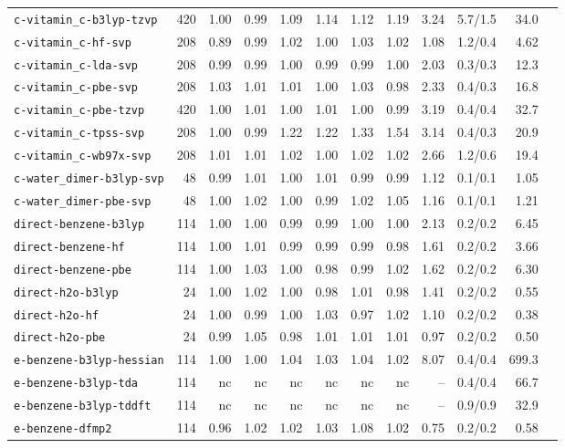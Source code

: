 \begin{longtable}{lrrrrrrrrrrr}
\texttt{c-vitamin\_c-b3lyp-tzvp} & 420 & 1.00 & 0.99 & 1.09 & 1.14 & 1.12 & 1.19 & 3.24 & 5.7/1.5 & 34.0 \\
\texttt{c-vitamin\_c-hf-svp} & 208 & 0.89 & 0.99 & 1.02 & 1.00 & 1.03 & 1.02 & 1.08 & 1.2/0.4 & 4.62 \\
\texttt{c-vitamin\_c-lda-svp} & 208 & 0.99 & 0.99 & 1.00 & 0.99 & 0.99 & 1.00 & 2.03 & 0.3/0.3 & 12.3 \\
\texttt{c-vitamin\_c-pbe-svp} & 208 & 1.03 & 1.01 & 1.01 & 1.00 & 1.03 & 0.98 & 2.33 & 0.4/0.3 & 16.8 \\
\texttt{c-vitamin\_c-pbe-tzvp} & 420 & 1.00 & 1.01 & 1.00 & 1.01 & 1.00 & 0.99 & 3.19 & 0.4/0.4 & 32.7 \\
\texttt{c-vitamin\_c-tpss-svp} & 208 & 1.00 & 0.99 & 1.22 & 1.22 & 1.33 & 1.54 & 3.14 & 0.4/0.3 & 20.9 \\
\texttt{c-vitamin\_c-wb97x-svp} & 208 & 1.01 & 1.01 & 1.02 & 1.00 & 1.02 & 1.02 & 2.66 & 1.2/0.6 & 19.4 \\
\texttt{c-water\_dimer-b3lyp-svp} & 48 & 0.99 & 1.01 & 1.00 & 1.01 & 0.99 & 0.99 & 1.12 & 0.1/0.1 & 1.05 \\
\texttt{c-water\_dimer-pbe-svp} & 48 & 1.00 & 1.02 & 1.00 & 0.99 & 1.02 & 1.05 & 1.16 & 0.1/0.1 & 1.21 \\
\texttt{direct-benzene-b3lyp} & 114 & 1.00 & 1.00 & 0.99 & 0.99 & 1.00 & 1.00 & 2.13 & 0.2/0.2 & 6.45 \\
\texttt{direct-benzene-hf} & 114 & 1.00 & 1.01 & 0.99 & 0.99 & 0.99 & 0.98 & 1.61 & 0.2/0.2 & 3.66 \\
\texttt{direct-benzene-pbe} & 114 & 1.00 & 1.03 & 1.00 & 0.98 & 0.99 & 1.02 & 1.62 & 0.2/0.2 & 6.30 \\
\texttt{direct-h2o-b3lyp} & 24 & 1.00 & 1.02 & 1.00 & 0.98 & 1.01 & 0.98 & 1.41 & 0.2/0.2 & 0.55 \\
\texttt{direct-h2o-hf} & 24 & 1.00 & 0.99 & 1.00 & 1.03 & 0.97 & 1.02 & 1.10 & 0.2/0.2 & 0.38 \\
\texttt{direct-h2o-pbe} & 24 & 0.99 & 1.05 & 0.98 & 1.01 & 1.01 & 1.01 & 0.97 & 0.2/0.2 & 0.50 \\
\texttt{e-benzene-b3lyp-hessian} & 114 & 1.00 & 1.00 & 1.04 & 1.03 & 1.04 & 1.02 & 8.07 & 0.4/0.4 & 699.3 \\
\texttt{e-benzene-b3lyp-tda} & 114 & nc & nc & nc & nc & nc & nc & -- & 0.4/0.4 & 66.7 \\
\texttt{e-benzene-b3lyp-tddft} & 114 & nc & nc & nc & nc & nc & nc & -- & 0.9/0.9 & 32.9 \\
\texttt{e-benzene-dfmp2} & 114 & 0.96 & 1.02 & 1.02 & 1.03 & 1.08 & 1.02 & 0.75 & 0.2/0.2 & 0.58 \\

\end{longtable}
